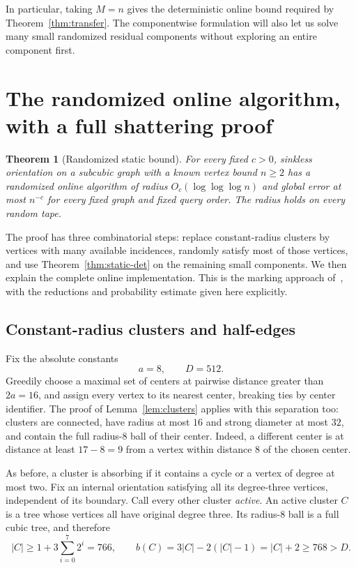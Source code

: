 \documentclass[11pt]{article}
\newtheorem{theorem}{Theorem}[section]
\theoremstyle{definition}
\begin{document}
In particular, taking $M=n$ gives the deterministic online bound required
by Theorem~\ref{thm:transfer}. The componentwise formulation will also let
us solve many small randomized residual components without exploring an
entire component first.

\section{The randomized online algorithm, with a full shattering proof}
\label{sec:static-random}

\begin{theorem}[Randomized static bound]\label{thm:static-random}
For every fixed $c>0$, sinkless orientation on a subcubic graph with a known
vertex bound $n\ge2$ has a randomized online algorithm of radius
$O_c(\log\log\log n)$ and global error at most $n^{-c}$ for every fixed
graph and fixed query order. The radius holds on every random tape.
\end{theorem}

The proof has three combinatorial steps: replace constant-radius clusters
by vertices with many available incidences, randomly satisfy most of those
vertices, and use Theorem~\ref{thm:static-det} on the remaining small
components. We then explain the complete online implementation. This is the
marking approach of~\cite{GS,GHK}, with the reductions and probability
estimate given here explicitly.

\subsection{Constant-radius clusters and half-edges}

Fix the absolute constants
\[
 a=8,\qquad D=512.
\]
Greedily choose a maximal set of centers at pairwise distance greater than
$2a=16$, and assign every vertex to its nearest center, breaking ties by
center identifier. The proof of Lemma~\ref{lem:clusters} applies with this
separation too: clusters are connected, have radius at most $16$ and strong
diameter at most $32$, and contain the full radius-$8$ ball of their center.
Indeed, a different center is at distance at least $17-8=9$ from a vertex
within distance $8$ of the chosen center.

As before, a cluster is absorbing if it contains a cycle or a vertex of
degree at most two. Fix an internal orientation satisfying all its
degree-three vertices, independent of its boundary. Call every other
cluster \emph{active}. An active cluster $C$ is a tree whose vertices all
have original degree three. Its radius-$8$ ball is a full cubic tree, and
therefore
\begin{equation}\label{eq:boost}
 |C|\ge1+3\sum_{i=0}^{7}2^i=766,\qquad
 b(C)=3|C|-2(|C|-1)=|C|+2\ge768>D.
\end{equation}
\end{document}
